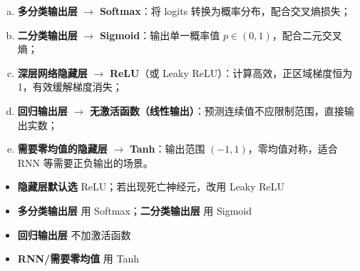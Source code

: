 \documentclass[a4paper,11pt]{ctexart}
\begin{document}
\begin{solutionbox}[参考答案与详细解析]
    \begin{enumerate}[a.]
        \item \textbf{多分类输出层} $\to$ \textbf{Softmax}：将 logits 转换为概率分布，配合交叉熵损失；
        \item \textbf{二分类输出层} $\to$ \textbf{Sigmoid}：输出单一概率值 $p \in (0,1)$，配合二元交叉熵；
        \item \textbf{深层网络隐藏层} $\to$ \textbf{ReLU}（或 Leaky ReLU）：计算高效，正区域梯度恒为1，有效缓解梯度消失；
        \item \textbf{回归输出层} $\to$ \textbf{无激活函数（线性输出）}：预测连续值不应限制范围，直接输出实数；
        \item \textbf{需要零均值的隐藏层} $\to$ \textbf{Tanh}：输出范围 $(-1,1)$，零均值对称，适合 RNN 等需要正负输出的场景。
    \end{enumerate}

    \begin{keybox}[激活函数选择速查卡]
        \begin{itemize}
            \item \textbf{隐藏层默认选} ReLU；若出现死亡神经元，改用 Leaky ReLU
            \item \textbf{多分类输出层} 用 Softmax；\textbf{二分类输出层} 用 Sigmoid
            \item \textbf{回归输出层} 不加激活函数
            \item \textbf{RNN/需要零均值} 用 Tanh
        \end{itemize}
    \end{keybox}
\end{solutionbox}
\end{document}
